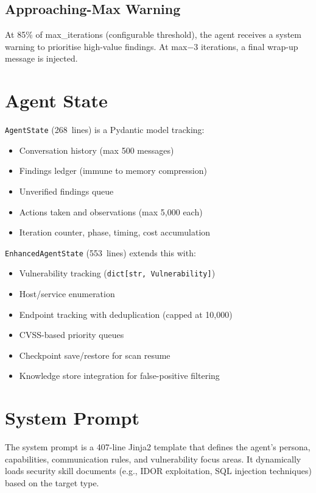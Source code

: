 \documentclass[12pt,a4paper]{report}
\begin{document}
\subsection{Approaching-Max Warning}
At 85\% of max\_iterations (configurable threshold), the agent receives a system
warning to prioritise high-value findings. At max$-3$ iterations, a final
wrap-up message is injected.

\section{Agent State}
\texttt{AgentState} (268~lines) is a Pydantic model tracking:
\begin{itemize}[noitemsep]
  \item Conversation history (max 500 messages)
  \item Findings ledger (immune to memory compression)
  \item Unverified findings queue
  \item Actions taken and observations (max 5,000 each)
  \item Iteration counter, phase, timing, cost accumulation
\end{itemize}

\texttt{EnhancedAgentState} (553~lines) extends this with:
\begin{itemize}[noitemsep]
  \item Vulnerability tracking (\texttt{dict[str, Vulnerability]})
  \item Host/service enumeration
  \item Endpoint tracking with deduplication (capped at 10,000)
  \item CVSS-based priority queues
  \item Checkpoint save/restore for scan resume
  \item Knowledge store integration for false-positive filtering
\end{itemize}

\section{System Prompt}
The system prompt is a 407-line Jinja2 template that defines the agent's persona,
capabilities, communication rules, and vulnerability focus areas. It dynamically
loads security skill documents (e.g., IDOR exploitation, SQL injection techniques)
based on the target type.
\end{document}
